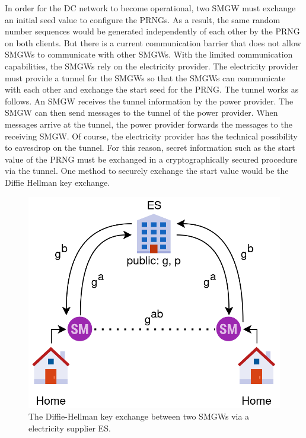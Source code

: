 In order for the DC network to become operational, two \gls{SMGW} must exchange an initial seed value to configure the PRNGs. %
As a result, the same random number sequences would be generated independently of each other by the PRNG on both clients. But there is a current communication barrier that does not allow \gls{SMGW}s to communicate with other \gls{SMGW}s. With the limited communication capabilities, the \gls{SMGW}s rely on the electricity provider. The electricity provider must provide a tunnel for the \gls{SMGW}s so that the \gls{SMGW}s can communicate with each other and exchange the start seed for the PRNG. The tunnel works as follows. An \gls{SMGW} receives the tunnel information by the power provider. The \gls{SMGW} can then send messages to the tunnel of the power provider. When messages arrive at the tunnel, the power provider forwards the messages to the receiving \gls{SMGW}. Of course, the electricity provider has the technical possibility to eavesdrop on the tunnel. For this reason, secret information such as the start value of the PRNG must be exchanged in a cryptographically secured procedure via the tunnel. One method to securely exchange the start value would be the Diffie Hellman key exchange.\\
\begin{figure}[tbp]
  \centering
  \includegraphics[scale=0.7]{images/key_exchange2.png}
  \caption[Diffie-Hellman Key Exchange in TR-03109]{The Diffie-Hellman key exchange between two SMGWs via a electricity supplier \gls{ES}.}
  \label{fig:keyexchange}
\end{figure}
